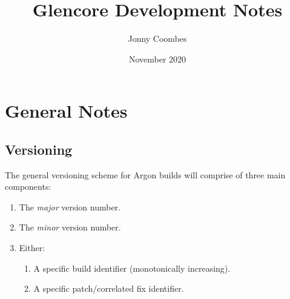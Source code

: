 \documentclass{book}
\title{Glencore Development Notes}
\author{Jonny Coombes}
\date{November 2020}
\begin{document}
\maketitle
{}
\newpage
\tableofcontents
\let\cleardoublepage=\clearpage
\newpage
{}

\chapter{General Notes}
\hoffset=0in
\evensidemargin=0in
\section{Versioning}
The general versioning scheme for Argon builds will comprise of three main components:
\begin{enumerate}
    \item The \textit{major} version number.
    \item The \textit{minor} version number.
    \item Either:
    \begin{enumerate}
        \item A specific build identifier (monotonically increasing).
        \item A specific patch/correlated fix identifier.
    \end{enumerate}
\end{enumerate}
\end{document}
